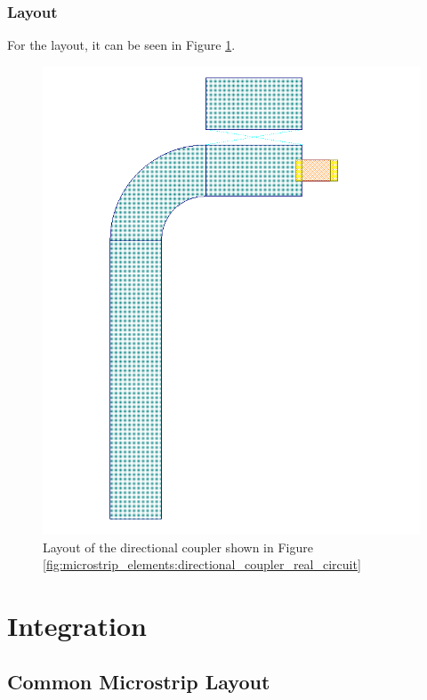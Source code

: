 \documentclass[12pt]{report} %
\let\oldsection\section
\renewcommand\section{\clearpage\oldsection}
\begin{document}
\subsection{Layout}

For the layout, it can be seen in Figure \ref{fig:microstrip_elements:directional_coupler_real_layout}.

\begin{figure}[htbp]
    \centering
    \includegraphics[width=1\linewidth]{images//microstrip_elements/directional_coupler_real_layout.png}
    \caption{Layout of the directional coupler shown in Figure \ref{fig:microstrip_elements:directional_coupler_real_circuit}}
    \label{fig:microstrip_elements:directional_coupler_real_layout}
\end{figure}

\chapter{Integration}

\section{Common Microstrip Layout}
\end{document}
